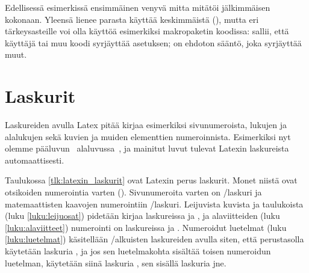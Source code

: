 Edellisessä esimerkissä ensimmäinen venyvä mitta  mitätöi
jälkimmäisen  kokonaan. Yleensä lienee parasta käyttää
keskimmäistä (), mutta eri tärkeysasteille voi olla käyttöä
esimerkiksi makropaketin koodissa:  sallii, että käyttäjä tai
muu koodi syrjäyttää asetuksen;  on ehdoton sääntö, joka
syrjäyttää muut.

\section{Laskurit}
\label{luku:laskurit}

Laskureiden avulla Latex pitää kirjaa esimerkiksi sivunumeroista,
lukujen ja alalukujen sekä kuvien ja muiden elementtien numeroinnista.
Esimerkiksi nyt olemme pääluvun~
alaluvussa~, ja mainitut luvut tulevat Latexin
laskureista automaattisesti.


Taulukossa \ref{tlk:latexin_laskurit} ovat Latexin perus laskurit. Monet
niistä ovat otsikoiden numerointia varten ().
Sivunumeroita varten on \-/laskuri ja matemaattisten
kaavojen numerointiin \-/laskuri. Leijuvista kuvista
ja taulukoista (luku \ref{luku:leijuosat}) pidetään kirjaa laskureissa
 ja , ja alaviitteiden (luku
\ref{luku:alaviitteet}) numerointi on laskureissa  ja
. Numeroidut luetelmat (luku \ref{luku:luetelmat})
käsitellään \-/alkuisten laskureiden avulla siten, että
perustasolla käytetään laskuria , ja jos sen
luetelmakohta sisältää toisen numeroidun luetelman, käytetään siinä
laskuria , sen sisällä laskuria  jne.

